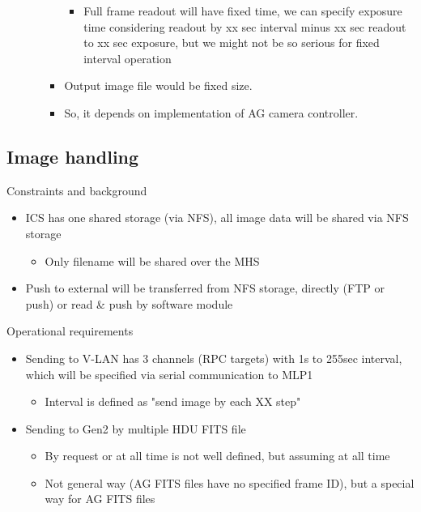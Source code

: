 \documentclass[a4paper,notitlepage]{article}
\begin{document}
\begin{itemize}
\begin{itemize}
\begin{itemize}
      \begin{itemize}
        \item Full frame readout will have fixed time, we can specify exposure time considering readout by xx sec interval minus xx sec readout to xx sec exposure, but we might not be so serious for fixed interval operation
      \end{itemize}
      \item Output image file would be fixed size.
      \item So, it depends on implementation of AG camera controller.
    \end{itemize}
  \end{itemize}
\end{itemize}

\subsection{Image handling}

Constraints and background
\begin{itemize}
  \item ICS has one shared storage (via NFS), all image data will be shared via NFS storage
  \begin{itemize}
    \item Only filename will be shared over the MHS
  \end{itemize}
  \item Push to external will be transferred from NFS storage, directly (FTP or push) or read \& push by software module
\end{itemize}

Operational requirements
\begin{itemize}
  \item Sending to V-LAN has 3 channels (RPC targets) with 1s to 255sec interval, which will be specified via serial communication to MLP1
  \begin{itemize}
    \item Interval is defined as "send image by each XX step"
  \end{itemize}
  \item Sending to Gen2 by multiple HDU FITS file
  \begin{itemize}
    \item By request or at all time is not well defined, but assuming at all time
    \item Not general way (AG FITS files have no specified frame ID), but a special way for AG FITS files
  \end{itemize}
\end{itemize}
\end{document}
